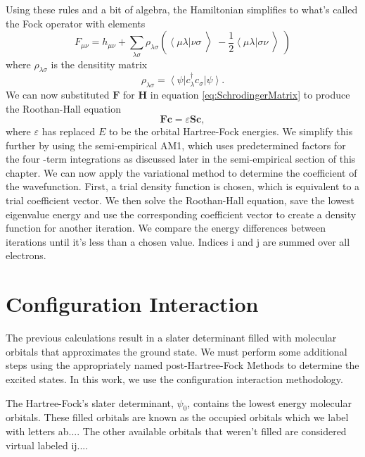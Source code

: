 Using these rules and a bit of algebra, the Hamiltonian simplifies to what's called the Fock operator with elements
\begin{equation}\label{eq:Fockelement}
  F_{\mu\nu} = h_{\mu\nu}
  + \sum_{\lambda \sigma} \rho_{\lambda \sigma}
  \left(
  \left< \mu \lambda \right| \nu \sigma \left>\right.
  - \frac{1}{2} \left< \mu \lambda \right| \sigma \nu \left>\right.
  \right)
\end{equation}
where \(\rho_{\lambda \sigma}\) is the densitity matrix
\begin{equation}
  \rho_{\lambda \sigma} = \left< \psi \right| c_\lambda^\dagger c_\sigma \left | \psi \right>.
\end{equation}
We can now substituted $\mathbf{F}$ for $\mathbf{H}$ in equation \ref{eq:SchrodingerMatrix} to produce the Roothan-Hall equation
\begin{equation}
  \mathbf{Fc}=\varepsilon\mathbf{Sc},
\end{equation}
where $\varepsilon$ has replaced $E$ to be the orbital Hartree-Fock energies.
We simplify this further by using the semi-empirical AM1, which uses predetermined factors for the four -term integrations as discussed later in the semi-empirical section of this chapter.
We can now apply the variational method to determine the coefficient of the wavefunction.
First, a trial density function is chosen, which is equivalent to a trial coefficient vector.
We then solve the Roothan-Hall equation, save the lowest eigenvalue energy and use the corresponding coefficient vector to create a density function for another iteration.
We compare the energy differences between iterations until it's less than a chosen value. 
Indices i and j are summed over all electrons.

\section{Configuration Interaction}\label{CI}
	The previous calculations result in a slater determinant filled with molecular orbitals that approximates the ground state.
	We must perform some additional steps using the appropriately named post-Hartree-Fock Methods to determine the excited states.
	In this work, we use the configuration interaction methodology.

	The Hartree-Fock's slater determinant, \(\psi_0\), contains the lowest energy molecular orbitals.
	These filled orbitals are known as the occupied orbitals which we label with letters ab....
	The other available orbitals that weren't filled are considered virtual labeled ij....

